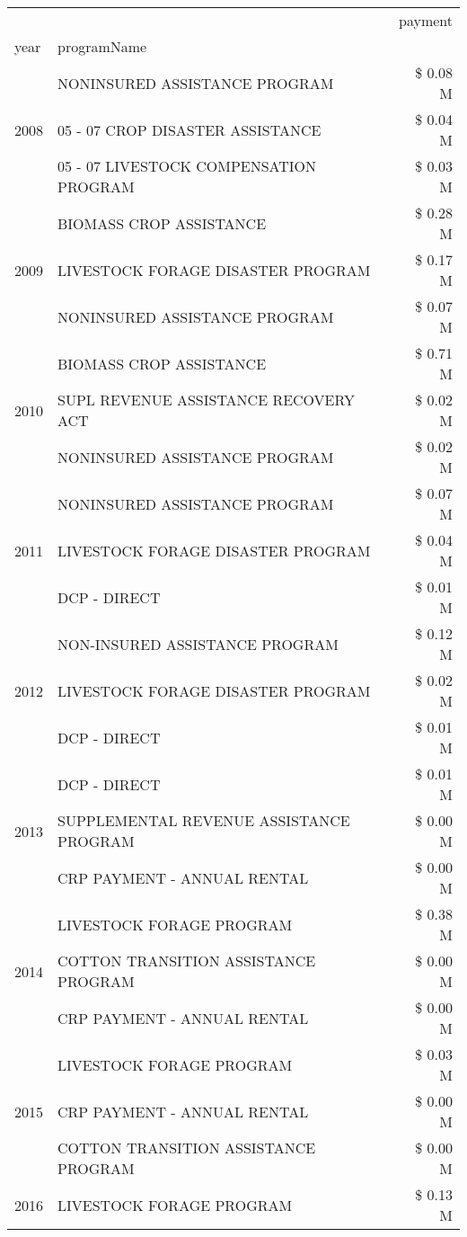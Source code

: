\begin{tabular}{llr}
\toprule
 &  & payment \\
year & programName &  \\
\midrule
\multirow[t]{3}{*}{2008} & NONINSURED ASSISTANCE PROGRAM & \$ 0.08 M \\
 & 05 - 07 CROP DISASTER ASSISTANCE & \$ 0.04 M \\
 & 05 - 07 LIVESTOCK COMPENSATION PROGRAM & \$ 0.03 M \\
\cline{1-3}
\multirow[t]{3}{*}{2009} & BIOMASS CROP ASSISTANCE & \$ 0.28 M \\
 & LIVESTOCK FORAGE DISASTER  PROGRAM & \$ 0.17 M \\
 & NONINSURED ASSISTANCE PROGRAM & \$ 0.07 M \\
\cline{1-3}
\multirow[t]{3}{*}{2010} & BIOMASS CROP ASSISTANCE & \$ 0.71 M \\
 & SUPL REVENUE ASSISTANCE RECOVERY ACT & \$ 0.02 M \\
 & NONINSURED ASSISTANCE PROGRAM & \$ 0.02 M \\
\cline{1-3}
\multirow[t]{3}{*}{2011} & NONINSURED ASSISTANCE PROGRAM & \$ 0.07 M \\
 & LIVESTOCK FORAGE DISASTER PROGRAM & \$ 0.04 M \\
 & DCP - DIRECT & \$ 0.01 M \\
\cline{1-3}
\multirow[t]{3}{*}{2012} & NON-INSURED ASSISTANCE PROGRAM & \$ 0.12 M \\
 & LIVESTOCK FORAGE DISASTER PROGRAM & \$ 0.02 M \\
 & DCP - DIRECT & \$ 0.01 M \\
\cline{1-3}
\multirow[t]{3}{*}{2013} & DCP - DIRECT & \$ 0.01 M \\
 & SUPPLEMENTAL REVENUE ASSISTANCE PROGRAM & \$ 0.00 M \\
 & CRP PAYMENT - ANNUAL RENTAL & \$ 0.00 M \\
\cline{1-3}
\multirow[t]{3}{*}{2014} & LIVESTOCK FORAGE PROGRAM & \$ 0.38 M \\
 & COTTON TRANSITION ASSISTANCE PROGRAM & \$ 0.00 M \\
 & CRP PAYMENT - ANNUAL RENTAL & \$ 0.00 M \\
\cline{1-3}
\multirow[t]{3}{*}{2015} & LIVESTOCK FORAGE PROGRAM & \$ 0.03 M \\
 & CRP PAYMENT - ANNUAL RENTAL & \$ 0.00 M \\
 & COTTON TRANSITION ASSISTANCE PROGRAM & \$ 0.00 M \\
\cline{1-3}
\multirow[t]{3}{*}{2016} & LIVESTOCK FORAGE PROGRAM & \$ 0.13 M \\

\end{tabular}
